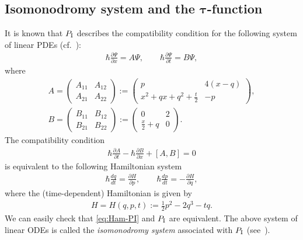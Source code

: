 \documentclass[pdftex]{sigma}
\theoremstyle{definition}
\numberwithin{equation}{section}
\def\PI{P_{\rm I}}
\def\p{\partial}
\begin{document}
\subsection[Isomonodromy system and the $\tau$-function]{Isomonodromy system and the $\boldsymbol{\tau}$-function}

It is known that $\PI$ describes the compatibility condition
for the following system of linear PDEs (cf.~\cite[Appendix C]{JM2}):
\begin{gather} \label{eq:Lax-matrix}
\hbar \frac{\p \Psi}{\p x}  = A \Psi, \qquad
\hbar \frac{\p \Psi}{\p t}  = B \Psi,
\end{gather}
where
\begin{gather*}
A   =
\begin{pmatrix}
A_{11} & A_{12} \\
A_{21} & A_{22}
\end{pmatrix}
:=
\begin{pmatrix}
  p
&
  4(x-q)
\\
\displaystyle x^{2} + q x + q^{2} + \frac{t}{2}
&
  - p
\end{pmatrix},
\\
B  =
\begin{pmatrix}
B_{11} & B_{12} \\
B_{21} & B_{22}
\end{pmatrix}
:=
\begin{pmatrix}
 0
&
   2
\\
\displaystyle \frac{x}{2} + q
&
  0
\end{pmatrix}.
\end{gather*}
The compatibility condition
\begin{gather*}
\hbar \frac{\p A}{\p t} - \hbar \frac{\p B}{\p x} + [A,B] = 0
\end{gather*}
is equivalent to the following Hamiltonian system
\begin{gather} \label{eq:Ham-PI}
\hbar \frac{dq}{dt} = \frac{\p H}{\p p}, \qquad
\hbar \frac{dp}{dt} = - \frac{\p H}{\p q},
\end{gather}
where the (time-dependent) Hamiltonian is given by
\begin{gather*}%
H = H(q,p,t) := \frac{1}{2}p^{2} - 2 q^{3} - t q.
\end{gather*}
We can easily check that \eqref{eq:Ham-PI} and $\PI$ are equivalent.
The above system of linear ODEs
is called the {\em isomonodromy system} associated with $\PI$
(see~\cite{JMU, JM2}).
\end{document}
